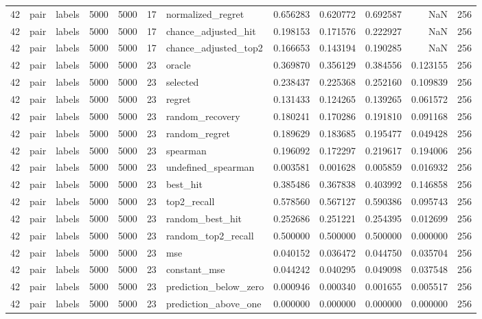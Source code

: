 \begin{tabular}{rllrrrlrrrrr}
42 & pair & labels & 5000 & 5000 & 17 & normalized_regret & 0.656283 & 0.620772 & 0.692587 & NaN & 256 \\
42 & pair & labels & 5000 & 5000 & 17 & chance_adjusted_hit & 0.198153 & 0.171576 & 0.222927 & NaN & 256 \\
42 & pair & labels & 5000 & 5000 & 17 & chance_adjusted_top2 & 0.166653 & 0.143194 & 0.190285 & NaN & 256 \\
42 & pair & labels & 5000 & 5000 & 23 & oracle & 0.369870 & 0.356129 & 0.384556 & 0.123155 & 256 \\
42 & pair & labels & 5000 & 5000 & 23 & selected & 0.238437 & 0.225368 & 0.252160 & 0.109839 & 256 \\
42 & pair & labels & 5000 & 5000 & 23 & regret & 0.131433 & 0.124265 & 0.139265 & 0.061572 & 256 \\
42 & pair & labels & 5000 & 5000 & 23 & random_recovery & 0.180241 & 0.170286 & 0.191810 & 0.091168 & 256 \\
42 & pair & labels & 5000 & 5000 & 23 & random_regret & 0.189629 & 0.183685 & 0.195477 & 0.049428 & 256 \\
42 & pair & labels & 5000 & 5000 & 23 & spearman & 0.196092 & 0.172297 & 0.219617 & 0.194006 & 256 \\
42 & pair & labels & 5000 & 5000 & 23 & undefined_spearman & 0.003581 & 0.001628 & 0.005859 & 0.016932 & 256 \\
42 & pair & labels & 5000 & 5000 & 23 & best_hit & 0.385486 & 0.367838 & 0.403992 & 0.146858 & 256 \\
42 & pair & labels & 5000 & 5000 & 23 & top2_recall & 0.578560 & 0.567127 & 0.590386 & 0.095743 & 256 \\
42 & pair & labels & 5000 & 5000 & 23 & random_best_hit & 0.252686 & 0.251221 & 0.254395 & 0.012699 & 256 \\
42 & pair & labels & 5000 & 5000 & 23 & random_top2_recall & 0.500000 & 0.500000 & 0.500000 & 0.000000 & 256 \\
42 & pair & labels & 5000 & 5000 & 23 & mse & 0.040152 & 0.036472 & 0.044750 & 0.035704 & 256 \\
42 & pair & labels & 5000 & 5000 & 23 & constant_mse & 0.044242 & 0.040295 & 0.049098 & 0.037548 & 256 \\
42 & pair & labels & 5000 & 5000 & 23 & prediction_below_zero & 0.000946 & 0.000340 & 0.001655 & 0.005517 & 256 \\
42 & pair & labels & 5000 & 5000 & 23 & prediction_above_one & 0.000000 & 0.000000 & 0.000000 & 0.000000 & 256 \\

\end{tabular}
